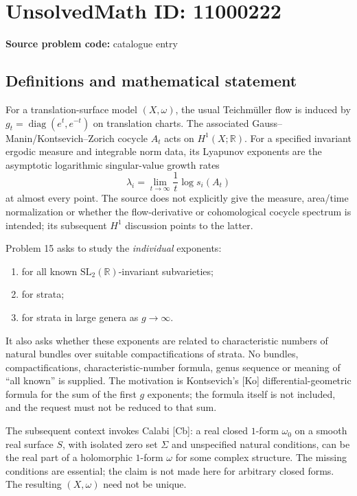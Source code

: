\documentclass[11pt]{article}
\newcommand{\R}{\mathbb{R}}
\begin{document}
\section*{UnsolvedMath ID: 11000222}
\textbf{Source problem code:} catalogue entry
\subsection{Definitions and mathematical statement}
For a translation-surface model \((X,\omega)\), the usual Teichmüller flow is induced by \(g_t=\operatorname{diag}(e^t,e^{-t})\) on translation charts. The associated Gauss--Manin/Kontsevich--Zorich cocycle \(A_t\) acts on \(H^1(X;\R)\). For a specified invariant ergodic measure and integrable norm data, its Lyapunov exponents are the asymptotic logarithmic singular-value growth rates
\[
 \lambda_i=\lim_{t\to\infty}\frac1t\log s_i(A_t)
\]
at almost every point. The source does not explicitly give the measure, area/time normalization or whether the flow-derivative or cohomological cocycle spectrum is intended; its subsequent \(H^1\) discussion points to the latter.

Problem 15 asks to study the \emph{individual} exponents:
\begin{enumerate}
\item for all known \(\mathrm{SL}_2(\R)\)-invariant subvarieties;
\item for strata;
\item for strata in large genera as \(g\to\infty\).
\end{enumerate}
It also asks whether these exponents are related to characteristic numbers of natural bundles over suitable compactifications of strata. No bundles, compactifications, characteristic-number formula, genus sequence or meaning of ``all known'' is supplied. The motivation is Kontsevich's [Ko] differential-geometric formula for the sum of the first \(g\) exponents; the formula itself is not included, and the request must not be reduced to that sum.

The subsequent context invokes Calabi [Cb]: a real closed \(1\)-form \(\omega_0\) on a smooth real surface \(S\), with isolated zero set \(\Sigma\) and unspecified natural conditions, can be the real part of a holomorphic \(1\)-form \(\omega\) for some complex structure. The missing conditions are essential; the claim is not made here for arbitrary closed forms. The resulting \((X,\omega)\) need not be unique.
\end{document}

